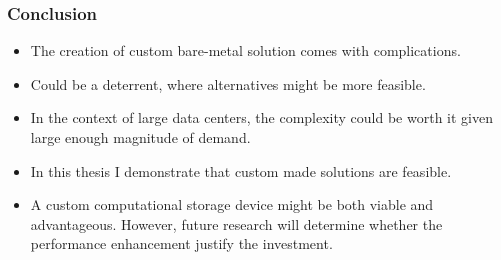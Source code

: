 \begin{frame}[hoved]
  \frametitle{Conclusion}
  \begin{itemize}
    \item The creation of custom bare-metal solution comes with complications.
    \item Could be a deterrent, where alternatives might be more feasible.
    \item In the context of large data centers, the complexity could be worth it
      given large enough magnitude of demand.
    \item In this thesis I demonstrate that custom made solutions are feasible.
    \item A custom computational storage device might be both viable and
      advantageous. However, future research will determine whether the performance
      enhancement justify the investment.
  \end{itemize}
\end{frame}
